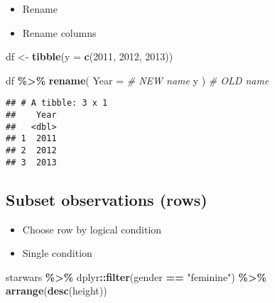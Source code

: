 \documentclass[
]{book}
\newenvironment{Shaded}{\begin{snugshade}}{\end{snugshade}}
\newcommand{\CommentTok}[1]{\textcolor[rgb]{0.56,0.35,0.01}{\textit{#1}}}
\newcommand{\DataTypeTok}[1]{\textcolor[rgb]{0.13,0.29,0.53}{#1}}
\newcommand{\DecValTok}[1]{\textcolor[rgb]{0.00,0.00,0.81}{#1}}
\newcommand{\KeywordTok}[1]{\textcolor[rgb]{0.13,0.29,0.53}{\textbf{#1}}}
\newcommand{\NormalTok}[1]{#1}
\newcommand{\OperatorTok}[1]{\textcolor[rgb]{0.81,0.36,0.00}{\textbf{#1}}}
\newcommand{\StringTok}[1]{\textcolor[rgb]{0.31,0.60,0.02}{#1}}
\begin{document}
\begin{itemize}
\item
  Rename
\item
  Rename columns
\end{itemize}

\begin{Shaded}
\begin{Highlighting}[]
\NormalTok{df \textless{}{-}}\StringTok{ }\KeywordTok{tibble}\NormalTok{(}\DataTypeTok{y =} \KeywordTok{c}\NormalTok{(}\DecValTok{2011}\NormalTok{, }\DecValTok{2012}\NormalTok{, }\DecValTok{2013}\NormalTok{))}

\NormalTok{df }\OperatorTok{\%\textgreater{}\%}
\StringTok{  }\KeywordTok{rename}\NormalTok{(}
    \DataTypeTok{Year =} \CommentTok{\# NEW name}
\NormalTok{      y}
\NormalTok{  ) }\CommentTok{\# OLD name}
\end{Highlighting}
\end{Shaded}

\begin{verbatim}
## # A tibble: 3 x 1
##    Year
##   <dbl>
## 1  2011
## 2  2012
## 3  2013
\end{verbatim}

\hypertarget{subset-observations-rows}{%
\subsection{Subset observations (rows)}\label{subset-observations-rows}}

\begin{itemize}
\item
  Choose row by logical condition
\item
  Single condition
\end{itemize}

\begin{Shaded}
\begin{Highlighting}[]
\NormalTok{starwars }\OperatorTok{\%\textgreater{}\%}
\StringTok{  }\NormalTok{dplyr}\OperatorTok{::}\KeywordTok{filter}\NormalTok{(gender }\OperatorTok{==}\StringTok{ "feminine"}\NormalTok{) }\OperatorTok{\%\textgreater{}\%}
\StringTok{  }\KeywordTok{arrange}\NormalTok{(}\KeywordTok{desc}\NormalTok{(height))}
\end{Highlighting}
\end{Shaded}
\end{document}
